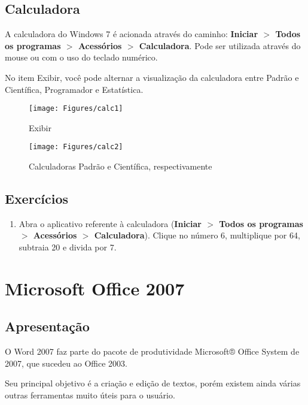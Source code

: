 \documentclass[12pt]{article}
\begin{document}
			\subsection{Calculadora}

			A calculadora do Windows 7 é acionada através do caminho: {\bf Iniciar $>$ Todos os programas $>$ Acessórios $>$ Calculadora}. Pode ser utilizada através do mouse ou com o uso do teclado numérico.
			
			No item Exibir, você pode alternar a visualização da calculadora entre Padrão e Científica, Programador e Estatística.	
			
			\begin{figure}[!h]
				\centering
				\texttt{[image: Figures/calc1]}
				\label{fig:calc1}
				\caption{Exibir}
			\end{figure}
			
			\begin{figure}[!h]
				\centering
				\texttt{[image: Figures/calc2]}
				\label{fig:calc2}
				\caption{Calculadoras Padrão e Científica, respectivamente}
			\end{figure}
			
		\subsection{Exercícios}
			
		\begin{enumerate}
			\item Abra o aplicativo referente à calculadora ({\bf Iniciar $>$ Todos os programas $>$ Acessórios $>$ Calculadora}). Clique no número 6, multiplique por 64, subtraia 20 e divida por 7.
		\end{enumerate}
			
	\section{Microsoft Office 2007}
	
	\subsection{Apresentação}
	
	O Word 2007 faz parte do pacote de produtividade Microsoft® Office System de 2007, que sucedeu ao Office 2003.

	Seu principal objetivo é a criação e edição de textos, porém existem ainda várias outras ferramentas muito úteis para o usuário.
		
\end{document}
